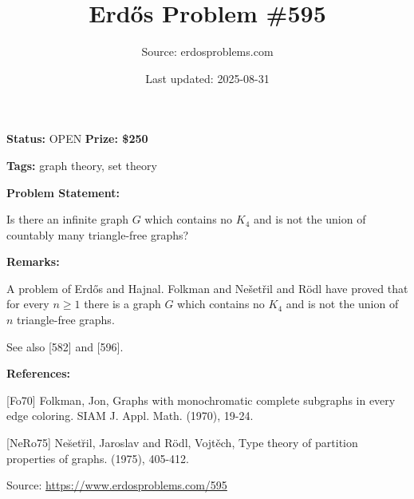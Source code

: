 \documentclass{article}
\title{Erd\H{o}s Problem \#595}
\date{Last updated: 2025-08-31}
\author{Source: erdosproblems.com}
\begin{document}
\maketitle

\noindent\textbf{Status:} OPEN \quad \textbf{Prize: \$250}

\noindent\textbf{Tags:} graph theory, set theory

\medskip
\noindent\textbf{Problem Statement:}

Is there an infinite graph $G$ which contains no $K_4$ and is not the union of countably many triangle-free graphs?

\bigskip
\noindent\textbf{Remarks:}

A problem of Erd\H{o}s and Hajnal. Folkman \cite{Fo70} and Ne\v{s}et\v{r}il and R\"{o}dl \cite{NeRo75} have proved that for every $n\geq 1$ there is a graph $G$ which contains no $K_4$ and is not the union of $n$ triangle-free graphs.

See also [582] and [596].

\bigskip
\noindent\textbf{References:}

[Fo70] Folkman, Jon, Graphs with monochromatic complete subgraphs in every edge
coloring. SIAM J. Appl. Math. (1970), 19-24.
 
 [NeRo75] Ne\u set\u ril, Jaroslav and R\"odl, Vojt\v ech, Type theory of partition properties of graphs. (1975), 405-412.

\bigskip
\noindent\small{Source: \url{https://www.erdosproblems.com/595}}
\end{document}
